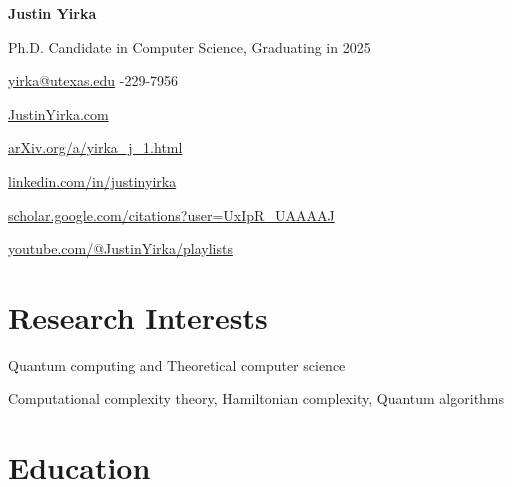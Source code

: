\documentclass[11pt,letterpaper,serif]{moderncv}
\begin{document}
\pagestyle{normal}


\thispagestyle{firstpage}

\begin{center}
	{\LARGE\textbf{Justin Yirka}}

	\smallskip{}

	Ph.D. Candidate in Computer Science, Graduating in 2025

	\medskip{}

	\href{mailto:yirka@utexas.edu}{yirka@utexas.edu}
	-229-7956

	\href{https://www.justinyirka.com}{JustinYirka.com}

	\medskip{}

	\href{https://arxiv.org/a/yirka_j_1.html}{arXiv.org/a/yirka\_j\_1.html}

	\faLinkedin{} \href{https://www.linkedin.com/in/justinyirka/}{linkedin.com/in/justinyirka}

	\faGraduationCap{} \href{https://scholar.google.com/citations?user=UxIpR_UAAAAJ}{scholar.google.com/citations?user=UxIpR\_UAAAAJ}

	\faYoutube{}
	\href{https://www.youtube.com/playlist?list=PLHxZKg_X23Knp1fhJJI2u9HZP39uhbr7O}{youtube.com/@JustinYirka/playlists}
\end{center}


\setlength{\parskip}{0em}

\section{Research Interests}
Quantum computing and Theoretical computer science

\qquad Computational complexity theory, Hamiltonian complexity, Quantum algorithms


\section{Education}
\end{document}
